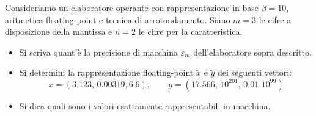 Consideriamo un elaboratore operante con rappresentazione in base
$\beta=10$, aritmetica floating-point e tecnica di arrotondamento.
Siano  $m=3$ le cifre a disposizione della mantissa e $n=2$ le
cifre per la  caratteristica.

\begin{itemize}
\item Si scriva
quant'\`{e} la precisione di macchina $\varepsilon_m$
dell'elaboratore sopra descritto.

\item Si determini la rappresentazione floating-point $\widetilde{x}$ e
$\widetilde{y}$ dei seguenti vettori:
\[ x=(3.123,\,  0.00319, 6.6), \quad \quad  y=(17.566, \, 10^{201},\,  0.01\,\,10^{99}) \]
\item Si dica quali sono i valori esattamente rappresentabili in
macchina.
\end{itemize}
